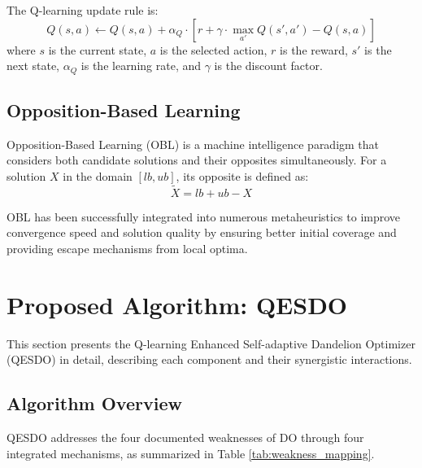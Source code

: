 \documentclass[preprint,12pt]{elsarticle}
\begin{document}
The Q-learning update rule is:
\begin{equation}
Q(s,a) \leftarrow Q(s,a) + \alpha_Q \cdot [r + \gamma \cdot \max_{a'} Q(s',a') - Q(s,a)]
\label{eq:qlearning}
\end{equation}
where $s$ is the current state, $a$ is the selected action, $r$ is the reward, $s'$ is the next state, $\alpha_Q$ is the learning rate, and $\gamma$ is the discount factor.

\subsection{Opposition-Based Learning}
\label{subsec:obl}

Opposition-Based Learning (OBL) \cite{tizhoosh2005opposition} is a machine intelligence paradigm that considers both candidate solutions and their opposites simultaneously. For a solution $X$ in the domain $[lb, ub]$, its opposite is defined as:
\begin{equation}
\tilde{X} = lb + ub - X
\label{eq:obl}
\end{equation}

OBL has been successfully integrated into numerous metaheuristics to improve convergence speed and solution quality by ensuring better initial coverage and providing escape mechanisms from local optima.

\section{Proposed Algorithm: QESDO}
\label{sec:proposed}

This section presents the Q-learning Enhanced Self-adaptive Dandelion Optimizer (QESDO) in detail, describing each component and their synergistic interactions.

\subsection{Algorithm Overview}
\label{subsec:overview}

QESDO addresses the four documented weaknesses of DO through four integrated mechanisms, as summarized in Table \ref{tab:weakness_mapping}.
\end{document}
